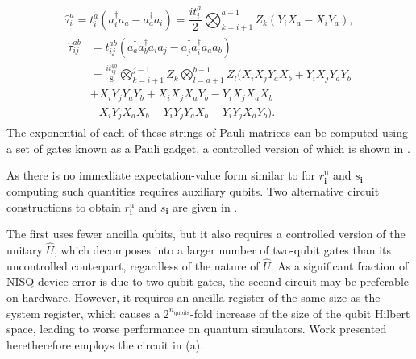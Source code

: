 \documentclass[%
 reprint,
 amsmath,amssymb,
 aps,
]{revtex4-2}
\begin{document}
\begin{equation}
\hat \tau_{i}^{a} = t_i^{a}(a^\dagger_i a_a - a^\dagger_a a_i) = \frac{it_{i}^{a}}{2} \bigotimes_{k=i+1}^{a-1} Z_k(Y_iX_a - X_iY_a),
\end{equation}
\begin{align}
\begin{split}
\hat \tau_{ij}^{ab} &= t_{ij}^{ab}(a^\dagger_a a^\dagger_b a_i a_j - a^\dagger_j a^\dagger_i a_a a_b)  \\
 &=\frac{it_{ij}^{ab}}{8}  \bigotimes_{k=i+1}^{j-1} Z_k  \bigotimes_{l=a+1}^{b-1} Z_l (X_i X_j Y_a X_b + Y_i X_j Y_a Y_b \\
 &+X_i Y_j Y_a Y_b + X_i X_j X_a Y_b  - Y_i X_j X_a X_b \\
 &- X_i Y_j X_a X_b - Y_i Y_j Y_a X_b - Y_i Y_j X_a Y_b).
\end{split}
\end{align}
The exponential of each of these strings of Pauli matrices can be computed using a set of gates known as a Pauli gadget,\cite{Cowtan2020} a controlled version of which is shown in .

 As there is no immediate expectation-value form similar to  for $r_\mathbf{i}^\mathrm{u}$ and $s_\mathbf{i}$ computing such quantities requires auxiliary qubits. Two alternative circuit constructions to obtain $r_\mathbf{i}^\mathrm{u}$ and $s_\mathbf{i}$ are given in . 

The first uses fewer ancilla qubits, but it also requires a controlled version of the unitary $\hat U$, which decomposes into a larger number of two-qubit gates than its uncontrolled couterpart, regardless of the nature of $\hat U$. As a significant fraction of NISQ device error is due to two-qubit gates, the second circuit may be preferable on hardware. However, { it requires an ancilla register of the same size as the system register, which causes a $2^{n_\mathrm{qubits}}$-fold increase of the size of the qubit Hilbert space, leading to worse performance on quantum simulators}. Work presented heretherefore employs the circuit in  (a). 
\end{document}
